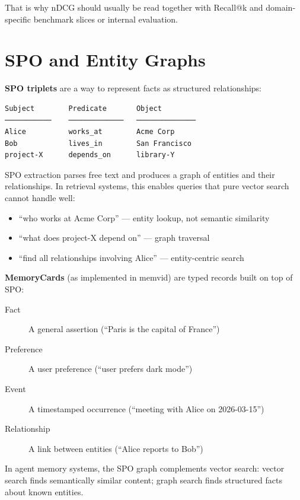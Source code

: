 That is why nDCG should usually be read together with Recall@k and domain-specific benchmark
slices or internal evaluation.

\section{SPO and Entity Graphs}

\textbf{SPO triplets} are a way to represent facts as structured relationships:

\begin{Verbatim}
Subject        Predicate       Object
───────────    ─────────────   ──────────────
Alice          works_at        Acme Corp
Bob            lives_in        San Francisco
project-X      depends_on      library-Y
\end{Verbatim}

SPO extraction parses free text and produces a graph of entities and their relationships.
In retrieval systems, this enables queries that pure vector search cannot handle well:

\begin{itemize}
    \item ``who works at Acme Corp'' --- entity lookup, not semantic similarity
    \item ``what does project-X depend on'' --- graph traversal
    \item ``find all relationships involving Alice'' --- entity-centric search
\end{itemize}

\textbf{MemoryCards} (as implemented in memvid) are typed records built on top of SPO:

\begin{description}
    \item[Fact] A general assertion (``Paris is the capital of France'')
    \item[Preference] A user preference (``user prefers dark mode'')
    \item[Event] A timestamped occurrence (``meeting with Alice on 2026-03-15'')
    \item[Relationship] A link between entities (``Alice reports to Bob'')
\end{description}

In agent memory systems, the SPO graph complements vector search: vector search finds
semantically similar content; graph search finds structured facts about known entities.

